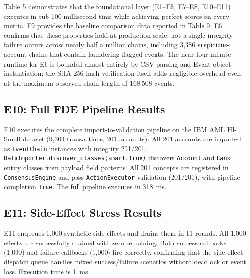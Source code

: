 Table 5 demonstrates that the foundational layer (E1--E5, E7--E8, E10--E11) executes in sub-100-millisecond time while achieving perfect scores on every metric. E9 provides the baseline comparison data reported in Table 9. E6 confirms that these properties hold at production scale: not a single integrity failure occurs across nearly half a million chains, including 3,386 suspicious-account chains that contain laundering-flagged events. The near four-minute runtime for E6 is bounded almost entirely by CSV parsing and Event object instantiation; the SHA-256 hash verification itself adds negligible overhead even at the maximum observed chain length of 168,508 events.


\subsection{E10: Full FDE Pipeline Results}
\label{e10-full-fde-pipeline-results}

E10 executes the complete import-to-validation pipeline on the IBM AML HI-Small dataset (9,300 transactions, 201 accounts). All 201 accounts are imported as \texttt{EventChain} instances with integrity 201/201. \texttt{DataImporter.discover\_classes(smart=True)} discovers \texttt{Account} and \texttt{Bank} entity classes from payload field patterns. All 201 concepts are registered in \texttt{ConsensusEngine} and pass \texttt{ActionExecutor} validation (201/201), with pipeline completion \texttt{True}. The full pipeline executes in 318~ms.

\subsection{E11: Side-Effect Stress Results}
\label{e11-side-effect-stress-results}

E11 enqueues 1,000 synthetic side effects and drains them in 11 rounds. All 1,000 effects are successfully drained with zero remaining. Both success callbacks (1,000) and failure callbacks (1,000) fire correctly, confirming that the side-effect dispatch queue handles mixed success/failure scenarios without deadlock or event loss. Execution time is 1~ms.

